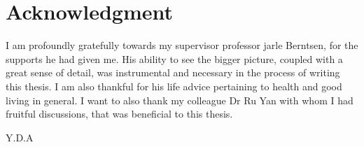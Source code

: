 \documentclass[../Main/thesis.tex]{subfiles}
\begin{document}
\chapter*{Acknowledgment}
I am profoundly gratefully towards my supervisor professor jarle Berntsen, for the supports he had given me. His ability to see the bigger picture, coupled with a great sense of detail, was instrumental and necessary in the process of writing this thesis. I am also thankful for his life advice pertaining to health and good living in general. 
I want to also thank my colleague Dr Ru Yan with whom I had fruitful discussions, that was beneficial to this thesis.


\begin{flushright}
Y.D.A
\end{flushright}

\blankpage
\end{document}
